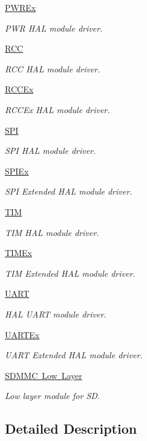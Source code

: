 \begin{DoxyCompactItemize}
\mbox{\hyperlink{group___p_w_r_ex}{P\+W\+R\+Ex}}
\begin{DoxyCompactList}\small\item\em P\+WR H\+AL module driver. \end{DoxyCompactList}\item 
\mbox{\hyperlink{group___r_c_c}{R\+CC}}
\begin{DoxyCompactList}\small\item\em R\+CC H\+AL module driver. \end{DoxyCompactList}\item 
\mbox{\hyperlink{group___r_c_c_ex}{R\+C\+C\+Ex}}
\begin{DoxyCompactList}\small\item\em R\+C\+C\+Ex H\+AL module driver. \end{DoxyCompactList}\item 
\mbox{\hyperlink{group___s_p_i}{S\+PI}}
\begin{DoxyCompactList}\small\item\em S\+PI H\+AL module driver. \end{DoxyCompactList}\item 
\mbox{\hyperlink{group___s_p_i_ex}{S\+P\+I\+Ex}}
\begin{DoxyCompactList}\small\item\em S\+PI Extended H\+AL module driver. \end{DoxyCompactList}\item 
\mbox{\hyperlink{group___t_i_m}{T\+IM}}
\begin{DoxyCompactList}\small\item\em T\+IM H\+AL module driver. \end{DoxyCompactList}\item 
\mbox{\hyperlink{group___t_i_m_ex}{T\+I\+M\+Ex}}
\begin{DoxyCompactList}\small\item\em T\+IM Extended H\+AL module driver. \end{DoxyCompactList}\item 
\mbox{\hyperlink{group___u_a_r_t}{U\+A\+RT}}
\begin{DoxyCompactList}\small\item\em H\+AL U\+A\+RT module driver. \end{DoxyCompactList}\item 
\mbox{\hyperlink{group___u_a_r_t_ex}{U\+A\+R\+T\+Ex}}
\begin{DoxyCompactList}\small\item\em U\+A\+RT Extended H\+AL module driver. \end{DoxyCompactList}\item 
\mbox{\hyperlink{group___s_d_m_m_c___l_l}{S\+D\+M\+M\+C Low Layer}}
\begin{DoxyCompactList}\small\item\em Low layer module for SD. \end{DoxyCompactList}\end{DoxyCompactItemize}


\subsection{Detailed Description}
